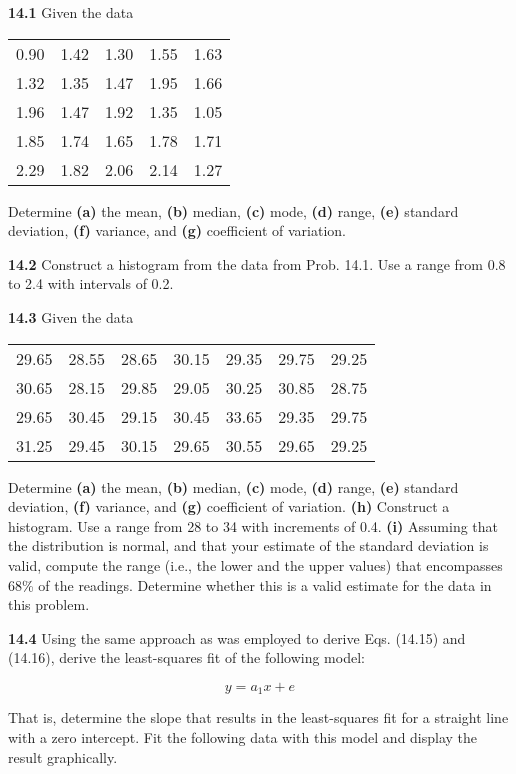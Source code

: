 \documentclass[../main.tex]{subfiles}
\begin{document}
\begin{multicols}{2}
    \noindent\textbf{14.1} Given the data

	\noindent \begin{tabular}{ c c c c c }
		0.90 & 1.42 & 1.30 & 1.55 & 1.63 \\
		1.32 & 1.35 & 1.47 & 1.95 & 1.66 \\
		1.96 & 1.47 & 1.92 & 1.35 & 1.05 \\
		1.85 & 1.74 & 1.65 & 1.78 & 1.71 \\
		2.29 & 1.82 & 2.06 & 2.14 & 1.27
	\end{tabular}

	\noindent Determine \textbf{(a)} the mean, \textbf{(b)} median, \textbf{(c)} mode, \textbf{(d)} range,
	\textbf{(e)} standard deviation, \textbf{(f)} variance, and \textbf{(g)} coefficient of
	variation.	


	\noindent\textbf{14.2}  Construct a histogram from the data from Prob. 14.1. Use a range from 0.8 to 2.4 with intervals of 0.2.

	\noindent\textbf{14.3} Given the data

	\noindent \begin{tabular}{c c c c c c c}
		29.65 & 28.55 & 28.65 & 30.15 & 29.35 & 29.75 & 29.25 \\
		30.65 & 28.15 & 29.85 & 29.05 & 30.25 & 30.85 & 28.75 \\
		29.65 & 30.45 & 29.15 & 30.45 & 33.65 & 29.35 & 29.75 \\
		31.25 & 29.45 & 30.15 & 29.65 & 30.55 & 29.65 & 29.25
	\end{tabular}

	\noindent Determine \textbf{(a)} the mean, \textbf{(b)} median, \textbf{(c)} mode, \textbf{(d)} range,
	\textbf{(e)} standard deviation, \textbf{(f)} variance, and \textbf{(g)} coefficient of
	variation.
	\textbf{(h)} Construct a histogram. Use a range from 28 to 34 with
	increments of 0.4.
	\textbf{(i)} Assuming that the distribution is normal, and that your
	estimate of the standard deviation is valid, compute the
	range (i.e., the lower and the upper values) that encompasses 68\% of the readings. Determine whether this is a
	valid estimate for the data in this problem.

	\noindent\textbf{14.4} Using the same approach as was employed to derive
	Eqs. (14.15) and (14.16), derive the least-squares fit of the
	following model:

	$$y = a_1 x + e$$

	\noindent That is, determine the slope that results in the least-squares fit for a straight line with a zero intercept. Fit the following data with this model and display the result graphically.


\end{multicols}
\end{document}
